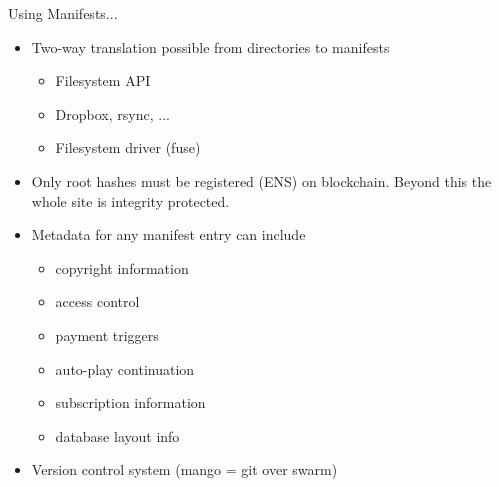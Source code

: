 \begin{frame}

\begin{block}{Using Manifests...}
\begin{itemize}
 \item Two-way translation possible from directories to manifests
  \begin{itemize}
   \item Filesystem API
   \item Dropbox, rsync, ...
   \item Filesystem driver (fuse)
  \end{itemize}
 \item Only root hashes must be registered (ENS) on blockchain. Beyond this the whole site is integrity protected.
 \item Metadata for any manifest entry can include
    \begin{itemize}
      \item copyright information
      \item access control
      \item payment triggers
      \item auto-play continuation
      \item subscription information
      \item database layout info
    \end{itemize}
 \item Version control system (mango = git over swarm)
\end{itemize}
\end{block}

\end{frame}
